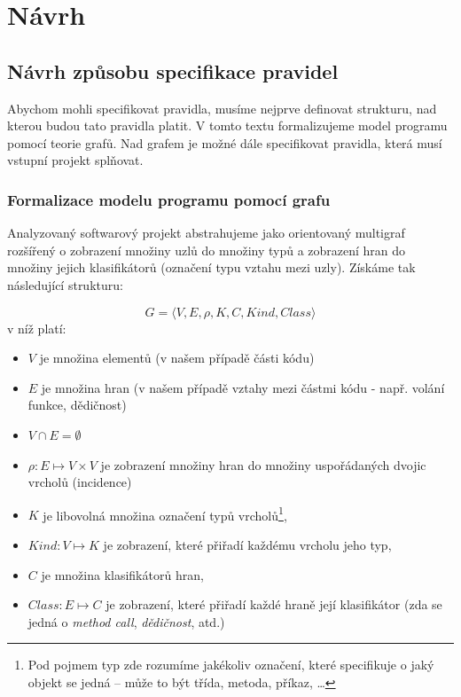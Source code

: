\chapter{Návrh}

\section{Návrh způsobu specifikace pravidel}

Abychom mohli specifikovat pravidla, musíme nejprve definovat strukturu, nad kterou budou tato pravidla platit. V tomto textu formalizujeme model programu pomocí teorie grafů. Nad grafem je možné dále specifikovat pravidla, která musí vstupní projekt splňovat.

\subsection{Formalizace modelu programu pomocí grafu}

Analyzovaný softwarový projekt abstrahujeme jako orientovaný multigraf rozšířený o zobrazení množiny uzlů do množiny typů a zobrazení hran do množiny jejich klasifikátorů (označení typu vztahu mezi uzly). Získáme tak následující strukturu:

\begin{displaymath}
G = \langle V, E, \rho, K, C, \mathit{Kind}, \mathit{Class}\rangle
\label{extended_multigraph}
\end{displaymath}
v níž platí:
\begin{itemize}
\item $V$ je množina elementů (v našem případě části kódu)
\item $E$ je množina hran (v našem případě vztahy mezi částmi kódu - např. volání funkce, dědičnost)
\item $V \cap E = \emptyset$
\item $\rho: E \mapsto V \times V$ je zobrazení množiny hran do množiny uspořádaných dvojic vrcholů (incidence)
\item $K$ je libovolná množina označení typů vrcholů\footnote{Pod pojmem typ zde rozumíme jakékoliv označení, které specifikuje o jaký objekt se jedná -- může to být třída, metoda, příkaz, \ldots},
\item $\mathit{Kind}: V \mapsto K$ je zobrazení, které přiřadí každému vrcholu jeho typ,
\item $C$ je množina klasifikátorů hran,
\item $\mathit{Class}: E \mapsto C$ je zobrazení, které přiřadí každé hraně její klasifikátor (zda se jedná o \emph{method call}, \emph{dědičnost}, atd.)
\end{itemize}

